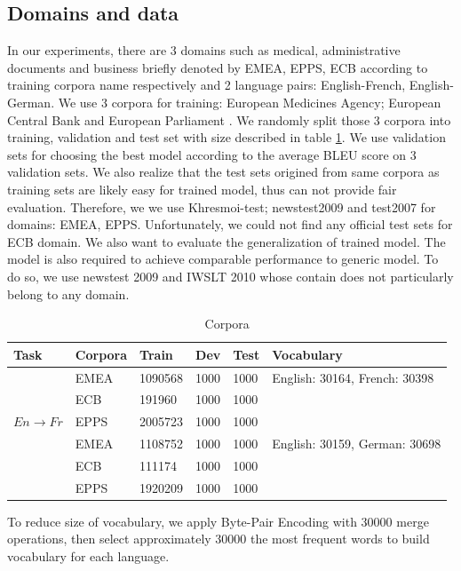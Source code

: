 \documentclass[11pt,a4paper]{article}
\newcommand{\fyTodo}[1]{\Todo[FY:]{\textcolor{orange}{#1}}}
\begin{document}
\subsection{Domains and data \label{ssec:data}}
In our experiments, there are 3 domains such as medical, administrative documents and business briefly denoted by EMEA, EPPS, ECB according to training corpora name respectively and 2 language pairs: English-French, English-German. We use 3 corpora for training: European Medicines Agency; European Central Bank and European Parliament \cite{Tiedemann2009RANLP5}. We randomly split those 3 corpora into training, validation and test set with size described in table \ref{table:Corpora}. We use validation sets for choosing the best model according to the average BLEU score on 3 validation sets. We also realize that the test sets origined from same corpora as training sets are likely easy for trained model, thus can not provide fair evaluation. Therefore, we we use Khresmoi-test; newstest2009 and test2007 for domains: EMEA, EPPS. Unfortunately, we could not find any official test sets for ECB domain. We also want to evaluate the generalization of trained model. The model is also required to achieve comparable performance to generic model. To do so, we use newstest 2009 and IWSLT 2010 whose contain does not particularly belong to any domain. \fyTodo{Clarify / simplify text}
\begin{table}
  \begin{tabular}{ |l|l|l|l|l|l| }
\hline
Task & Corpora & Train & Dev & Test & Vocabulary \\ \hline
\multirow{5}{*}{$En \rightarrow Fr$} & EMEA & 1090568 & 1000 & 1000 & English: 30164, French: 30398\\
 & ECB & 191960 & 1000 & 1000 &\\
 & EPPS & 2005723 & 1000 & 1000 & \\ \hline
\multirow{5}{*}{$En \rightarrow Ge$} & EMEA & 1108752 & 1000 & 1000 & English: 30159, German: 30698\\
 & ECB & 111174 & 1000 & 1000 &\\
 & EPPS & 1920209 & 1000 & 1000 & \\ \hline
\hline
\end{tabular}
\caption{Corpora }
\label{table:Corpora}
\end{table}
To reduce size of vocabulary, we apply Byte-Pair Encoding with 30000 merge operations, then select approximately 30000 the most frequent words to build vocabulary for each language. 
\end{document}
